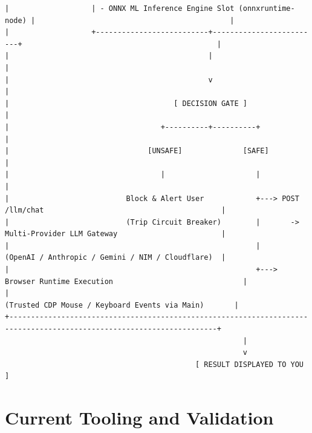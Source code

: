 \documentclass[11pt,a4paper]{article}
\begin{document}
\begin{lstlisting}
|                   | - ONNX ML Inference Engine Slot (onnxruntime-node) |                                             |
|                   +--------------------------+-------------------------+                                             |
|                                              |                                                                       |
|                                              v                                                                       |
|                                      [ DECISION GATE ]                                                               |
|                                   +----------+----------+                                                            |
|                                [UNSAFE]              [SAFE]                                                          |
|                                   |                     |                                                            |
|                           Block & Alert User            +---> POST /llm/chat                                         |
|                           (Trip Circuit Breaker)        |       -> Multi-Provider LLM Gateway                        |
|                                                         |          (OpenAI / Anthropic / Gemini / NIM / Cloudflare)  |
|                                                         +---> Browser Runtime Execution                              |
|                                                                 (Trusted CDP Mouse / Keyboard Events via Main)       |
+----------------------------------------------------------------------------------------------------------------------+
                                                       |
                                                       v
                                            [ RESULT DISPLAYED TO YOU ]
\end{lstlisting}

\section{Current Tooling and Validation}
\end{document}
